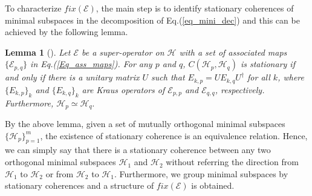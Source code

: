 \documentclass[journal]{IEEEtran}
\def\h{\ensuremath{\mathcal{H}}}
\def\e{\ensuremath{\mathcal{E}}}
\newtheorem{lemma}{Lemma}
\begin{document}
To characterize $fix(\e)$, the main step is to identify stationary coherences of minimal subspaces in  the decomposition of Eq.(\ref{eq_mini_dec}) and this can be achieved  by the following lemma.

\begin{lemma}[\cite{baumgartner2012structure}]\label{Lem_SC}
  Let $\e$ be a super-operator on $\h$ with a set of associated maps $\{\e_{p,q}\}$ in Eq.(\ref{Eq_ass_maps}). For any $p$ and $q$,  $C(\h_p,\h_q)$ is stationary if and only if there is a unitary matrix $U$ such that 
  $E_{k,p}=UE_{k,q}U^\dagger$ for all $k$, where $\{E_{k,p}\}_k$ and $\{E_{k,q}\}_k$ are Kraus operators of $\e_{p,p}$ and $\e_{q,q}$, respectively.  Furthermore, $\h_p\simeq\h_q.$
\end{lemma}

By the above lemma, given a set of mutually orthogonal minimal subspaces $\{\h_p\}_{p=1}^{m}$, the existence of stationary coherence is an equivalence relation. Hence, we can simply say that  there is a stationary coherence between any two orthogonal minimal subspaces $\h_1$ and $\h_2$ without referring the direction from $\h_1$ to $\h_2$ or from $\h_2$ to $\h_1$. 
Furthermore,  we   group minimal subspaces by stationary coherences and a structure of $fix(\e)$ is obtained. 
\end{document}
